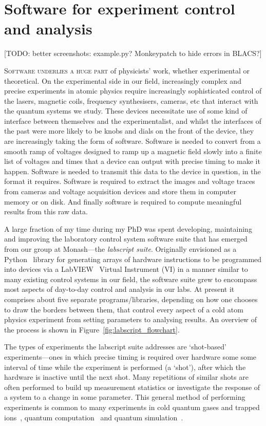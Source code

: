 \chapter{Software for experiment control and analysis}\label{chap:software}

[TODO: better screenshots: example.py? Monkeypatch to hide errors in BLACS?]

\lettrine[lines=3]{S}{oftware underlies a huge part} of physicists' work, whether experimental or theoretical. On the experimental side in our field, increasingly complex and precise experiments in atomic physics require increasingly sophisticated control of the lasers, magnetic coils, frequency synthesisers, cameras, etc that interact with the quantum systems we study. These devices necessitate use of some kind of interface between themselves and the experimentalist, and whilst the interfaces of the past were more likely to be knobs and dials on the front of the device, they are increasingly taking the form of software. Software is needed to convert from a smooth ramp of voltages designed to ramp up a magnetic field slowly into a finite list of voltages and times that a device can output with precise timing to make it happen. Software is needed to transmit this data to the device in question, in the format it requires. Software is required to extract the images and voltage traces from cameras and voltage acquisition devices and store them in computer memory or on disk. And finally software is required to compute meaningful results from this raw data.

A large fraction of my time during my PhD was spent developing, maintaining and improving the laboratory control system software suite that has emerged from our group at Monash---the \emph{labscript suite}. Originally envisioned as a Python~\cite{python_software_foundation_python_2018} library for generating arrays of hardware instructions to be programmed into devices via a LabVIEW~\cite{national_instruments_laboratory_2018} Virtual Instrument (\textsc{VI}) in a manner similar to many existing control systems in our field, the software suite grew to encompass most aspects of day-to-day control and analysis in our labs. At present it comprises about five separate programs/libraries, depending on how one chooses to draw the borders between them, that control every aspect of a cold atom physics experiment from setting parameters to analysing results. An overview of the process is shown in Figure~\ref{fig:labscript_flowchart}.

The types of experiments the labscript suite addresses are `shot-based' experiments---ones in which precise timing is required over hardware some some interval of time while the experiment is performed (a `shot'), after which the hardware is inactive until the next shot. Many repetitions of similar shots are often performed to build up measurement statistics or investigate the response of a system to a change in some parameter. This general method of performing experiments is common to many experiments in cold quantum gases and trapped ions~\cite{robins_atom_2013-1, cronin_optics_2009-1}, quantum computation~\cite{negretti_quantum_2011-1, ladd_quantum_2010-1} and quantum simulation~\cite{bloch_quantum_2012-1, blatt_quantum_2012-1}.

